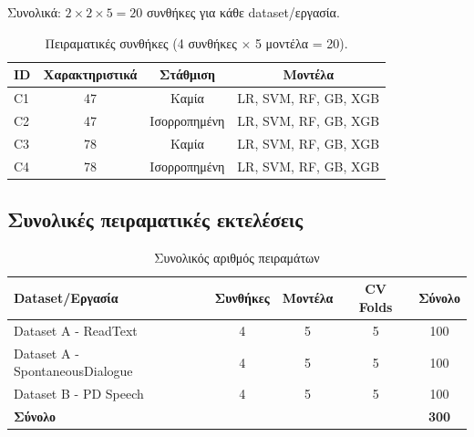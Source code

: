 Συνολικά: $2 \times 2 \times 5 = 20$ συνθήκες για κάθε dataset/εργασία.

\begin{table}[H]
\centering
\small
\begin{tabular}{@{}lccc@{}}
\toprule
\textbf{ID} & \textbf{Χαρακτηριστικά} & \textbf{Στάθμιση} & \textbf{Μοντέλα} \\
\midrule
C1 & 47 & Καμία & LR, SVM, RF, GB, XGB \\
C2 & 47 & Ισορροπημένη & LR, SVM, RF, GB, XGB \\
C3 & 78 & Καμία & LR, SVM, RF, GB, XGB \\
C4 & 78 & Ισορροπημένη & LR, SVM, RF, GB, XGB \\
\bottomrule
\end{tabular}
\caption{Πειραματικές συνθήκες (4 συνθήκες $\times$ 5 μοντέλα = 20).}
\label{tab:conditions}
\end{table}

\subsection{Συνολικές πειραματικές εκτελέσεις}

\begin{table}[H]
\centering
\begin{tabular}{@{}lcccc@{}}
\toprule
\textbf{Dataset/Εργασία} & \textbf{Συνθήκες} & \textbf{Μοντέλα} & \textbf{CV Folds} & \textbf{Σύνολο} \\
\midrule
Dataset A - ReadText & 4 & 5 & 5 & 100 \\
Dataset A - SpontaneousDialogue & 4 & 5 & 5 & 100 \\
Dataset B - PD Speech & 4 & 5 & 5 & 100 \\
\midrule
\textbf{Σύνολο} & & & & \textbf{300} \\
\bottomrule
\end{tabular}
\caption{Συνολικός αριθμός πειραμάτων}
\label{tab:total-runs}
\end{table}

